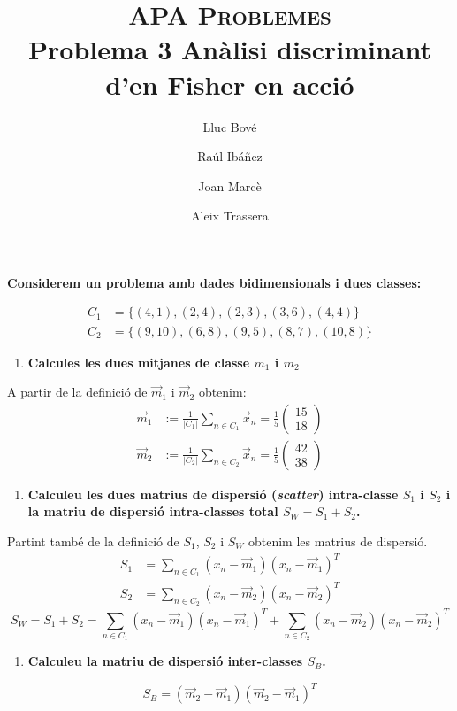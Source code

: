 \documentclass[a4paper]{article}
\title{\textsc{APA Problemes} \\ Problema 3 Anàlisi discriminant d'en Fisher en acció}
\author{Lluc Bové \and Raúl Ibáñez \and Joan Marcè \and Aleix Trassera}
\date{}
\begin{document}
\maketitle

\textbf{Considerem un problema amb dades bidimensionals i dues classes:}

\begin{align*}
	C_1 &= \{(4, 1), (2, 4), (2, 3), (3, 6), (4, 4)\} \\
	C_2 &= \{(9, 10), (6, 8), (9, 5), (8, 7), (10, 8)\}
\end{align*}

\begin{enumerate}[resume=main]
	\item \textbf{Calcules les dues mitjanes de classe $m_1$ i $m_2$}
\end{enumerate}
A partir de la definició de $\vec{m}_1$ i $\vec{m}_2$ obtenim:
\begin{align*}
\vec{m}_1 &:= \frac{1}{|C_1|} \sum_{n \in C_1} \vec{x}_n =
\frac{1}{5}
\begin{pmatrix}
15 \\
18
\end{pmatrix}
\\
\vec{m}_2 &:= \frac{1}{|C_2|} \sum_{n \in C_2} \vec{x}_n =
\frac{1}{5}
\begin{pmatrix}
42 \\
38
\end{pmatrix}
\end{align*}

\begin{enumerate}[resume=main]
	\item \textbf{Calculeu les dues matrius de dispersió (\emph{scatter}) intra-classe $S_1$ i $S_2$ i la matriu de dispersió intra-classes total $S_W = S_1 + S_2$.}
\end{enumerate}
Partint també de la definició de $S_1$, $S_2$ i $S_W$ obtenim les matrius de dispersió.
\begin{align*}
	S_1 &= \sum_{n \in C_1} (x_n - \vec{m}_1)(x_n - \vec{m}_1)^T \\
	S_2 &= \sum_{n \in C_2} (x_n - \vec{m}_2)(x_n - \vec{m}_2)^T
\end{align*}
$$
S_W = S_1 + S_2 = 
\sum_{n \in C_1} (x_n - \vec{m}_1)(x_n - \vec{m}_1)^T + 
\sum_{n \in C_2} (x_n - \vec{m}_2)(x_n - \vec{m}_2)^T
$$

\begin{enumerate}[resume=main]
	\item \textbf{Calculeu la matriu de dispersió inter-classes $S_B$.}
\end{enumerate}
$$
S_B = (\vec{m}_2 - \vec{m}_1)(\vec{m}_2 - \vec{m}_1)^T
$$
\end{document}
